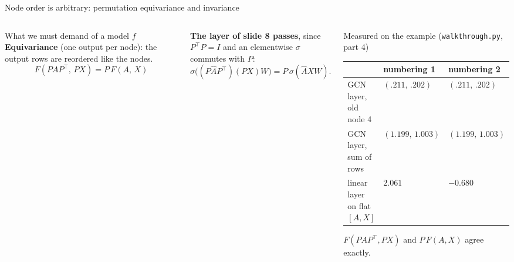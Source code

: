 \documentclass[aspectratio=169,10pt]{beamer}
\newcommand{\T}{\top}
\newcommand{\key}[1]{\textbf{\color{cAtt}#1}}
\newcommand{\Ah}{\hat A}
\begin{document}
\begin{frame}{Node order is arbitrary: permutation equivariance and invariance}
\begin{columns}[T,onlytextwidth]
\begin{block}{What we must demand of a model $f$}
\vspace{0.5mm}
\key{Equivariance} (one output per node): the output rows are reordered like the nodes.
\vspace{-1.5mm}\[ F(PAP^\T,\,PX)=P\,F(A,\,X) \]
\vspace{-5mm}
\end{block}
\vspace{-0.5mm}
{\footnotesize\textbf{The layer of slide 8 passes}, since $P^\T P=I$ and an elementwise $\sigma$ commutes with $P$:}
\vspace{-1mm}
\[ \sigma\bigl((P\Ah P^\T)(PX)W\bigr)=P\,\sigma(\Ah XW). \]
\vspace{-5mm}
\begin{block}{Measured on the example (\texttt{walkthrough.py}, part 4)}
\footnotesize
\renewcommand{\arraystretch}{1.1}
\begin{tabular}{@{}p{33mm}ll@{}}
 & numbering 1 & numbering 2\\
\midrule
GCN layer, old node 4 & $(.211,\,.202)$ & $(.211,\,.202)$\\
GCN layer, sum of rows & $(1.199,\,1.003)$ & $(1.199,\,1.003)$\\
linear layer on flat $[A,X]$ & $2.061$ & {\color{cBad}$-0.680$}\\
\end{tabular}

\vspace{0.5mm}
$F(PAP^\T,PX)$ and $P\,F(A,X)$ agree exactly.
\end{block}
\end{columns}
\end{frame}
\end{document}
